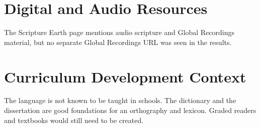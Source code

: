 \documentclass[12pt]{article}
\begin{document}
\section{Digital and Audio Resources}
The Scripture Earth page mentions audio scripture and Global Recordings material, but no separate Global Recordings URL was seen in the results.

\section{Curriculum Development Context}
The language is not known to be taught in schools. The dictionary and the dissertation are good foundations for an orthography and lexicon. Graded readers and textbooks would still need to be created.
\end{document}
